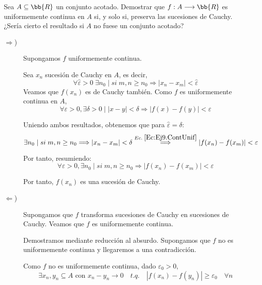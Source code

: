 \begin{ejercicio}
    Sea $A\subseteq \bb{R}$ un conjunto acotado. Demostrar que $f:A\longrightarrow \bb{R}$ es uniformemente continua en $A$ si, y solo si, preserva las sucesiones de Cauchy. ¿Sería cierto el resultado si $A$ no fuese un conjunto acotado?

    \begin{description}
        \item [$\Longrightarrow$)] Supongamos $f$ uniformemente continua.
        
        Sea $x_n$ sucesión de Cauchy en $A$, es decir,
        $$\forall \hat{\varepsilon}>0\;\exists n_0 \mid si\; m,n\geq n_0 \Longrightarrow |x_n - x_m| < \hat{\varepsilon}$$
        Veamos que $f(x_n)$ es de Cauchy también. Como $f$ es uniformemente continua en $A$,
        \begin{equation}\label{Ec:Ej9.ContUnif}
            \forall \varepsilon>0,\exists \delta>0\mid |x-y|<\delta\Longrightarrow |f(x)-f(y)|<\varepsilon
        \end{equation}

        Uniendo ambos resultados, obtenemos que para $\hat{\varepsilon}=\delta$:
        \begin{equation*}
            \exists n_0 \mid si\; m,n\geq n_0 \Longrightarrow |x_n - x_m| < \delta \stackrel{Ec.\;\ref{Ec:Ej9.ContUnif}}{\Longrightarrow} |f(x_n)-f(x_m)| < \varepsilon 
        \end{equation*}

        Por tanto, resumiendo:
        \begin{equation*}
            \forall \varepsilon>0, \exists n_0\mid si\; m,n\geq n_0 \Longrightarrow |f(x_n)-f(x_m)| < \varepsilon 
        \end{equation*}

        Por tanto, $f(x_n)$ es una sucesión de Cauchy.
        
        \item [$\Longleftarrow$)] Supongamos que $f$ transforma sucesiones de Cauchy en sucesiones de Cauchy. Veamos que $f$ es uniformemente continua.

        Demostramos mediante reducción al absurdo. Supongamos que $f$ no es uniformemente continua y llegaremos a una contradicción.
        
        Como $f$ no es uniformemente continua, dado $\varepsilon_0 > 0$,
        \begin{equation}\label{Ej9:Absurdo}
            \exists x_n,y_n \subseteq A \text{ con } x_n - y_n \to 0 \quad t.q. \quad |f(x_n) - f(y_n)| \geq \varepsilon_0\quad \forall n
        \end{equation}


\end{description}
\end{ejercicio}
